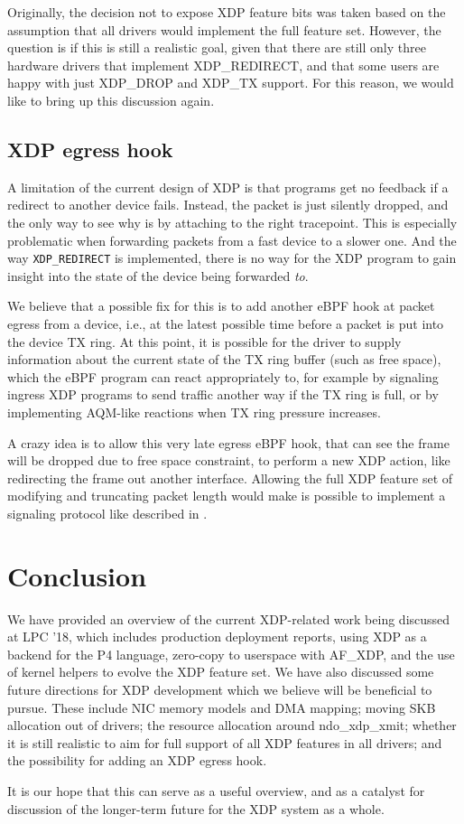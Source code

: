 \documentclass[sigconf]{acmart}
\begin{document}
Originally, the decision not to expose XDP feature bits was taken based on the
assumption that all drivers would implement the full feature set. However, the
question is if this is still a realistic goal, given that there are still only
three hardware drivers that implement XDP\_REDIRECT, and that some users are
happy with just XDP\_DROP and XDP\_TX support. For this reason, we would like to
bring up this discussion again.


\subsection{XDP egress hook}
\label{sec:xdp-egress-hook}

A limitation of the current design of XDP is that programs get no feedback if a
redirect to another device fails. Instead, the packet is just silently dropped,
and the only way to see why is by attaching to the right tracepoint. This is
especially problematic when forwarding packets from a fast device to a slower
one. And the way \texttt{XDP\_REDIRECT} is implemented, there is no way for the
XDP program to gain insight into the state of the device being forwarded
\emph{to}.

We believe that a possible fix for this is to add another eBPF hook at packet
egress from a device, i.e., at the latest possible time before a packet is put
into the device TX ring. At this point, it is possible for the driver to supply
information about the current state of the TX ring buffer (such as free space),
which the eBPF program can react appropriately to, for example by signaling
ingress XDP programs to send traffic another way if the TX ring is full, or by
implementing AQM-like reactions when TX ring pressure increases.

A crazy idea is to allow this very late egress eBPF hook, that can see the frame
will be dropped due to free space constraint, to perform a new XDP action, like
redirecting the frame out another interface.  Allowing the full XDP feature set
of modifying and truncating packet length would make is possible to implement a
signaling protocol like described in \cite{NDP}.

\section{Conclusion}
\label{sec:conclusion}

We have provided an overview of the current XDP-related work being discussed at
LPC '18, which includes production deployment reports, using XDP as a backend
for the P4 language, zero-copy to userspace with AF\_XDP, and the use of kernel
helpers to evolve the XDP feature set. We have also discussed some future
directions for XDP development which we believe will be beneficial to pursue.
These include NIC memory models and DMA mapping; moving SKB allocation out of
drivers; the resource allocation around ndo\_xdp\_xmit; whether it is still
realistic to aim for full support of all XDP features in all drivers; and the
possibility for adding an XDP egress hook.

It is our hope that this can serve as a useful overview, and as a catalyst for
discussion of the longer-term future for the XDP system as a whole.




\end{document}
